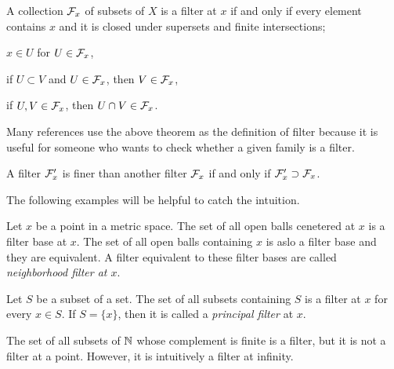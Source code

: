 \documentclass{../crs}
\begin{document}
\begin{thm}
A collection $\mathcal{F}_x$ of subsets of $X$ is a filter at $x$ if and only if every element contains $x$ and it is closed under supersets and finite intersections;
\begin{cond}
\item $x\in U$ for $U\in\mathcal{F}_x$,
\item if $U\subset V$ and $U\in\mathcal{F}_x$, then $V\in\mathcal{F}_x$,
\item if $U,V\in\mathcal{F}_x$, then $U\cap V\in\mathcal{F}_x$.
\end{cond}
\end{thm}
\begin{pf}
\end{pf}

Many references use the above theorem as the definition of filter because it is useful for someone who wants to check whether a given family is a filter.

\begin{thm}
A filter $\mathcal{F}'_x$ is finer than another filter $\mathcal{F}_x$ if and only if $\mathcal{F}'_x\supset\mathcal{F}_x$.
\end{thm}
\begin{pf}
\end{pf}

The following examples will be helpful to catch the intuition.

\begin{ex}\label{ex:neighborhood filter}
Let $x$ be a point in a metric space.
The set of all open balls cenetered at $x$ is a filter base at $x$.
The set of all open balls containing $x$ is aslo a filter base and they are equivalent.
A filter equivalent to these filter bases are called \emph{neighborhood filter at $x$}.
\end{ex}
\begin{ex}
Let $S$ be a subset of a set.
The set of all subsets containing $S$ is a filter at $x$ for every $x\in S$.
If $S=\{x\}$, then it is called a \emph{principal filter} at $x$.
\end{ex}
\begin{ex}
The set of all subsets of $\mathbb{N}$ whose complement is finite is a filter, but it is not a filter at a point.
However, it is intuitively a filter at infinity.
\end{ex}
\end{document}
